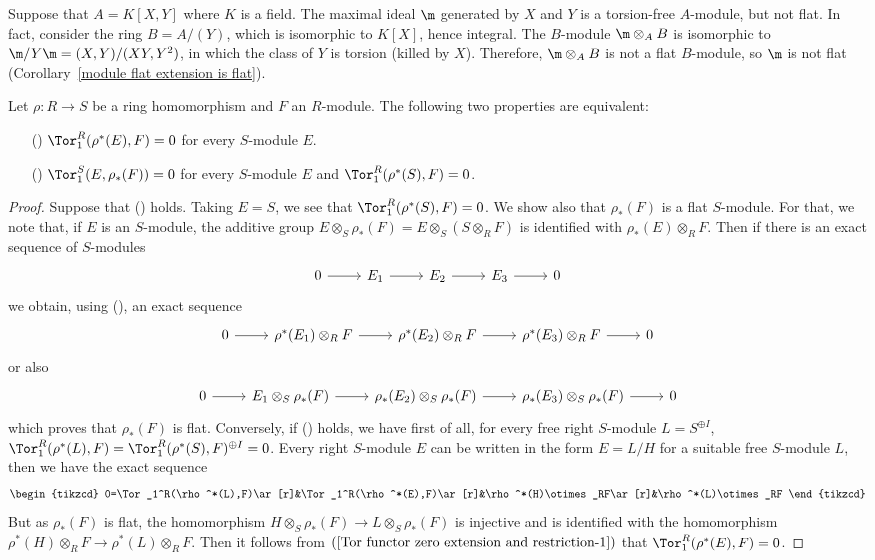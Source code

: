 \begin{example}
Suppose that $A=K[X,Y]$ where $K$ is a field. The maximal ideal $\m$ generated by $X$ and $Y$ is a torsion-free $A$-module, but not flat. In fact, consider the ring $B=A/(Y)$, which is isomorphic to $K[X]$, hence integral. The $B$-module $\m\otimes_AB$ is isomorphic to $\m/Y\m=(X,Y)/(XY,Y^2)$, in which the class of $Y$ is torsion (killed by $X$). Therefore, $\m\otimes_AB$ is not a flat $B$-module, so $\m$ is not flat (Corollary~\ref{module flat extension is flat}). 
\end{example}
\begin{proposition}\label{Tor functor zero extension and restriction}
Let $\rho:R\to S$ be a ring homomorphism and $F$ an $R$-module. The following two properties are equivalent:
\begin{itemize}
\item[(\rmnum{1})] $\Tor_1^R(\rho^*(E),F)=0$ for every $S$-module $E$.
\item[(\rmnum{2})] $\Tor_1^S(E,\rho_*(F))=0$ for every $S$-module $E$ and $\Tor_1^R(\rho^*(S),F)=0$.
\end{itemize}
\end{proposition}
\begin{proof}
Suppose that () holds. Taking $E=S$, we see that $\Tor_1^R(\rho^*(S),F)=0$. We show also that $\rho_*(F)$ is a flat $S$-module. For that, we note that, if $E$ is an $S$-module, the additive group $E\otimes_S\rho_*(F)=E\otimes_S(S\otimes_RF)$ is identified with $\rho_*(E)\otimes_RF$. Then if there is an exact sequence of $S$-modules
\[\begin{tikzcd}[row sep=5pt]
0\ar[r]&E_1\ar[r]&E_2\ar[r]&E_3\ar[r]&0
\end{tikzcd}\]
we obtain, using (), an exact sequence
\[\begin{tikzcd}[row sep=5pt]
0\ar[r]&\rho^*(E_1)\otimes_RF\ar[r]&\rho^*(E_2)\otimes_RF\ar[r]&\rho^*(E_3)\otimes_RF\ar[r]&0
\end{tikzcd}\]
or also
\[\begin{tikzcd}
0\ar[r]&E_1\otimes_S\rho_*(F)\ar[r]&\rho_*(E_2)\otimes_S\rho_*(F)\ar[r]&\rho_*(E_3)\otimes_S\rho_*(F)\ar[r]&0
\end{tikzcd}\]
which proves that $\rho_*(F)$ is flat. Conversely, if () holds, we have first of all, for every free right $S$-module $L=S^{\oplus I}$, $\Tor_1^R(\rho^*(L),F)=\Tor_1^R(\rho^*(S),F)^{\oplus I}=0$. Every right $S$-module $E$ can be written in the form $E=L/H$ for a suitable free $S$-module $L$, then we have the exact sequence
\begin{equation}\label{Tor functor zero extension and restriction-1}
\begin{tikzcd}
0=\Tor_1^R(\rho^*(L),F)\ar[r]&\Tor_1^R(\rho^*(E),F)\ar[r]&\rho^*(H)\otimes_RF\ar[r]&\rho^*(L)\otimes_RF
\end{tikzcd}
\end{equation}
But as $\rho_*(F)$ is flat, the homomorphism $H\otimes_S\rho_*(F)\to L\otimes_S\rho_*(F)$ is injective and is identified with the homomorphism $\rho^*(H)\otimes_RF\to\rho^*(L)\otimes_RF$. Then it follows from $(\ref{Tor functor zero extension and restriction-1})$ that $\Tor_1^R(\rho^*(E),F)=0$.
\end{proof}
